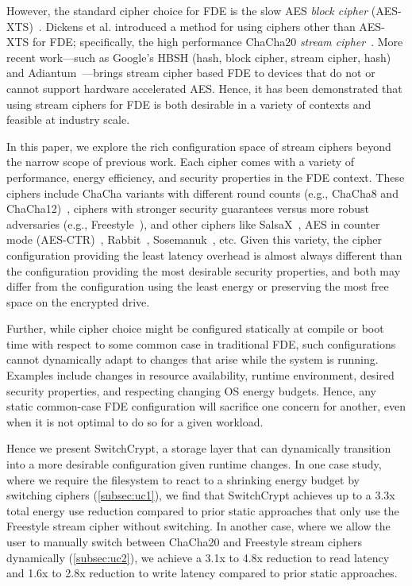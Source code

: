 However, the standard cipher choice for FDE is the slow AES \emph{block cipher}
(AES-XTS)~\cite{XTS, XTSComments, NISTXTS}. Dickens et al. introduced a method
for using ciphers other than AES-XTS for FDE; specifically, the high performance
ChaCha20 \emph{stream cipher}~\cite{StrongBox, ChaCha20}. More recent
work---such as Google's HBSH (hash, block cipher, stream cipher, hash) and
Adiantum~\cite{Adiantum}---brings stream cipher based FDE to devices that do not
or cannot support hardware accelerated AES. Hence, it has been demonstrated that
using stream ciphers for FDE is both desirable in a variety of contexts and
feasible at industry scale.

In this paper, we explore the rich configuration space of stream ciphers beyond
the narrow scope of previous work. Each cipher comes with a variety of
performance, energy efficiency, and security properties in the FDE context.
These ciphers include ChaCha variants with different round counts (e.g.,
ChaCha8 and ChaCha12)~\cite{ChaCha20}, ciphers with stronger security
guarantees versus more robust adversaries (e.g., Freestyle~\cite{Freestyle}),
and other ciphers like SalsaX~\cite{SalsaX}, AES in counter mode
(AES-CTR)~\cite{AESCTR}, Rabbit~\cite{Rabbit}, Sosemanuk~\cite{Sosemanuk}, etc.
Given this variety, the cipher configuration providing the least latency
overhead is almost always different than the configuration providing the most
desirable security properties, and both may differ from the configuration using
the least energy or preserving the most free space on the encrypted drive.

Further, while cipher choice might be configured statically at compile or boot
time with respect to some common case in traditional FDE, such configurations
cannot dynamically adapt to changes that arise while the system is running.
Examples include changes in resource availability, runtime environment, desired
security properties, and respecting changing OS energy budgets. Hence, any
static common-case FDE configuration will sacrifice one concern for another,
even when it is not optimal to do so for a given workload.

Hence we present SwitchCrypt, a storage layer that can dynamically transition
into a more desirable configuration given runtime changes. In one case study,
where we require the filesystem to react to a shrinking energy budget by
switching ciphers (\cref{subsec:uc1}), we find that SwitchCrypt achieves up to a
3.3x total energy use reduction compared to prior static approaches that only
use the Freestyle stream cipher without switching. In another case, where we
allow the user to manually switch between ChaCha20 and Freestyle stream ciphers
dynamically (\cref{subsec:uc2}), we achieve a 3.1x to 4.8x reduction to read
latency and 1.6x to 2.8x reduction to write latency compared to prior static
approaches.

